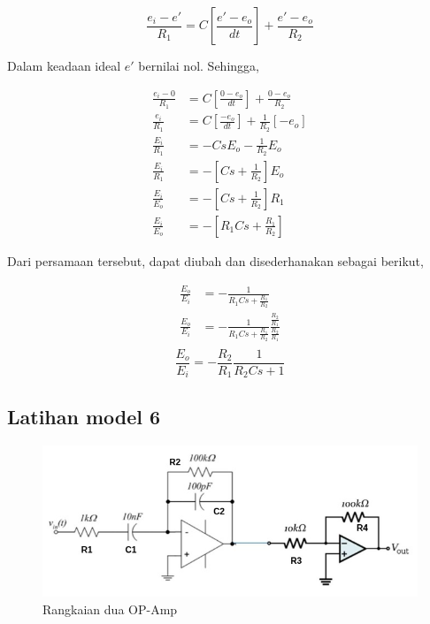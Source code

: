 \documentclass[12pt]{journal}
\begin{document}
 \begin{equation*}
    \frac{e_i-e'}{R_1}=C[\frac{e'-e_o}{dt}]+\frac{e'-e_o}{R_2}
 \end{equation*}
 
 Dalam keadaan ideal $e'$ bernilai nol. Sehingga,
    
\begin{equation*}
    \begin{split}
        \frac{e_i-0}{R_1} &= C[\frac{0-e_o}{dt}]+\frac{0-e_o}{R_2} \\[5pt]
        \frac{e_i}{R_1} &= C[\frac{-e_o}{dt}]+\frac{1}{R_2}[-e_o] \\[5pt]
        \frac{E_i}{R_1} &= -CsE_o-\frac{1}{R_2}E_o \\[5pt]
        \frac{E_i}{R_1} &= -[Cs+\frac{1}{R_2}]E_o \\[5pt]
        \frac{E_i}{E_o} &= -[Cs+\frac{1}{R_2}]R_1 \\[5pt]
        \frac{E_i}{E_o} &= -[R_1Cs+\frac{R_1}{R_2}]
    \end{split}
\end{equation*}
    
Dari persamaan tersebut, dapat diubah dan disederhanakan sebagai berikut,

\begin{equation*}
    \begin{split}
        \frac{E_o}{E_i} &= -\frac{1}{R_1Cs+\frac{R_1}{R_2}} \\[5pt]
        \frac{E_o}{E_i} &= -\frac{1}{R_1Cs+\frac{R_1}{R_2}} \frac{\frac{R_2}{R_1}}{\frac{R_2}{R_1}} \\[5pt]
    \end{split}
\end{equation*}
\begin{equation}
    \frac{E_o}{E_i} = -\frac{R_2}{R_1} \frac{1}{R_2Cs+1}
\end{equation}

\pagebreak

\subsection{Latihan model 6}

\begin{figure}[H]
    \centering
    \includegraphics[width=\textwidth]{model_nomor_6.jpg}
    \caption{Rangkaian dua OP-Amp}
    \label{soal_nomor_6}
\end{figure}
\end{document}
